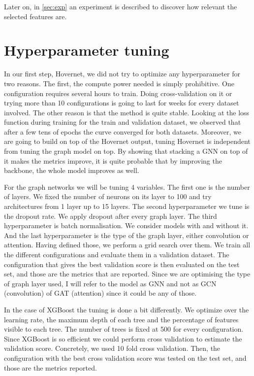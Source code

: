 \noindent Later on, in \autoref{sec:exp} an experiment is described to discover how relevant the selected features are.

\section{Hyperparameter tuning}

In our first step, Hovernet, we did not try to optimize any hyperparameter for two reasons. The first, the compute power needed is simply prohibitive. One configuration requires several hours to train. Doing cross-validation on it or trying more than 10 configurations is going to last for weeks for every dataset involved. The other reason is that the method is quite stable. Looking at the loss function during training for the train and validation dataset, we observed that after a few tens of epochs the curve converged for both datasets. Moreover, we are going to build on top of the Hovernet output, tuning Hovernet is independent from tuning the graph model on top. By showing that stacking a GNN on top of it makes the metrics improve, it is quite probable that by improving the backbone, the whole model improves as well. 

For the graph networks we will be  tuning 4 variables. The first one is the number of layers. We fixed the number of neurons on its layer to 100 and try architectures from 1 layer up to 15 layers. The second hyperparameter we tune is the dropout rate. We apply dropout after every graph layer. The third hyperparameter is batch normalisation. We consider models with and without it. And the last hyperparameter is the type of the graph layer, either convolution or attention. Having defined those, we perform a grid search over them. We train all the different configurations and evaluate them in a validation dataset. The configuration that gives the best validation score is then evaluated on the test set, and those are the metrics that are reported. Since we are optimising the type of graph layer used, I will refer to the model as GNN and not as GCN (convolution) of GAT (attention) since it could be any of those.

In the case of XGBoost the tuning is done a bit differently. We optimize over the learning rate, the maximum depth of each tree and the percentage of features visible to each tree. The number of trees is fixed at 500 for every configuration. Since XGBoost is so efficient we could perform cross validation to estimate the validation score. Concretely, we used 10 fold cross validation. Then, the configuration with the best cross validation score was tested on the test set, and those are the metrics reported.

